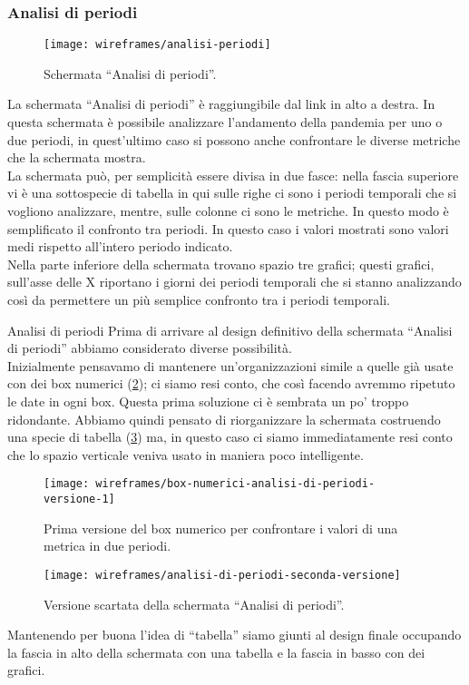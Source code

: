 \subsubsection{Analisi di periodi}\label{ss:analisi-di-periodi}
\begin{figure}[H]
    \centering
    \texttt{[image: wireframes/analisi-periodi]}
    \caption{Schermata ``Analisi di periodi''.}\label{fig:analisi-periodi}
\end{figure}
La schermata ``Analisi di periodi'' è raggiungibile dal link in alto a destra. In questa schermata è possibile analizzare l'andamento della pandemia per uno o due periodi, in quest'ultimo caso si possono anche confrontare le diverse metriche che la schermata mostra.\\
La schermata può, per semplicità essere divisa in due fasce: nella fascia superiore vi è una sottospecie di tabella in qui sulle righe ci sono i periodi temporali che si vogliono analizzare, mentre, sulle colonne ci sono le metriche. In questo modo è semplificato il confronto tra periodi. In questo caso i valori mostrati sono valori medi rispetto all'intero periodo indicato.\\
Nella parte inferiore della schermata trovano spazio tre grafici; questi grafici, sull'asse delle X riportano i giorni dei periodi temporali che si stanno analizzando così da permettere un più semplice confronto tra i periodi temporali.

\begin{bclogo}{Analisi di periodi}
Prima di arrivare al design definitivo della schermata ``Analisi di periodi'' abbiamo considerato diverse possibilità.\\
Inizialmente pensavamo di mantenere un'organizzazioni simile a quelle già usate con dei box numerici (\ref{fig:box-numerici-analisi-di-periodi-versione-1}); ci siamo resi conto, che così facendo avremmo ripetuto le date in ogni box. Questa prima soluzione ci è sembrata un po' troppo ridondante. Abbiamo quindi pensato di riorganizzare la schermata costruendo una specie di tabella (\ref{fig:analisi-di-periodi-seconda-versione}) ma, in questo caso ci siamo immediatamente resi conto che lo spazio verticale veniva usato in maniera poco intelligente.
\begin{figure}[H]
    \centering
    \texttt{[image: wireframes/box-numerici-analisi-di-periodi-versione-1]}
    \caption{Prima versione del box numerico per confrontare i valori di una metrica in due periodi.}\label{fig:box-numerici-analisi-di-periodi-versione-1}
\end{figure}
\begin{figure}[H]
    \centering
    \texttt{[image: wireframes/analisi-di-periodi-seconda-versione]}
    \caption{Versione scartata della schermata ``Analisi di periodi''.}\label{fig:analisi-di-periodi-seconda-versione}
\end{figure}

Mantenendo per buona l'idea di ``tabella'' siamo giunti al design finale occupando la fascia in alto della schermata con una tabella e la fascia in basso con dei grafici.
\end{bclogo}

